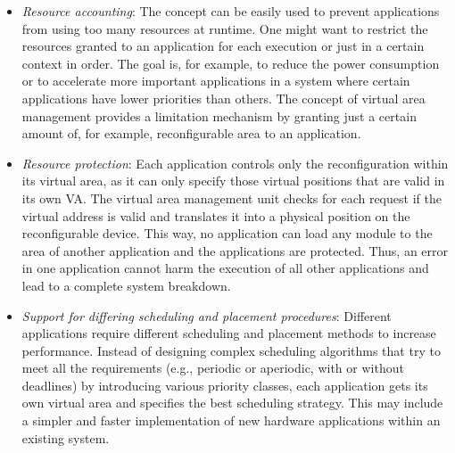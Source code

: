 \documentclass[10pt,journal]{IEEEtran}
\begin{document}
\begin{itemize}

\item \emph{Resource accounting}: The concept can be easily used to
  prevent applications from using too many resources at runtime. 
  One might want to restrict the resources
  granted to an application for each execution or just in a
  certain context in order. The goal is, for example,
  to reduce the power consumption
  or to accelerate more important applications in a system where
  certain applications have lower priorities than others.
  The concept of virtual area management provides a
  limitation mechanism by granting just a certain amount of, for example,
  reconfigurable area to an application.

\item \emph{Resource protection}: Each application controls only the
  reconfiguration within its virtual area, as it can only specify those
  virtual positions that are valid in its own VA. The virtual
  area management unit checks for each request if
  the virtual address is valid and translates it into a physical
  position on the reconfigurable device. This way, no application can
  load any module to the area of another application and the
  applications are protected. Thus, an error in one application cannot
  harm the execution of all other applications and lead to a complete
  system breakdown.

\item \emph{Support for differing scheduling and placement
    procedures}: Different applications require different scheduling
  and placement methods to increase performance. Instead of designing
  complex scheduling algorithms that try to meet all the
  requirements (e.g., periodic or aperiodic, with or without
  deadlines) by introducing various priority classes, each
  application gets its own virtual area and specifies the
  best scheduling strategy. This may include a simpler and faster
  implementation of new hardware applications within an existing
  system.


\end{itemize}
\end{document}
